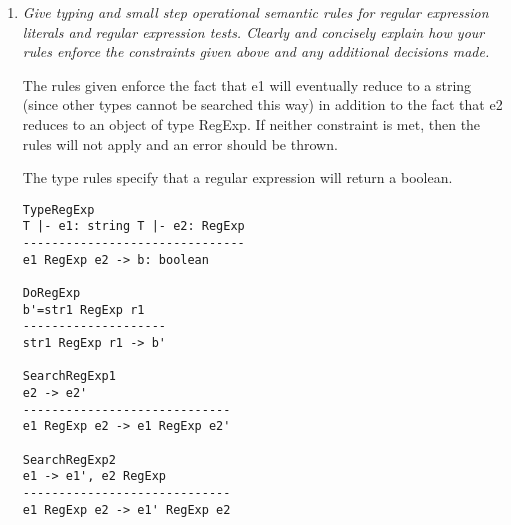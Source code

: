\documentclass[12pt,letterpaper]{article}
\begin{document}
\begin{enumerate}
\begin{enumerate}
\item \textit{Give typing and small step operational semantic rules for regular expression literals and regular expression tests. Clearly and concisely explain how your rules enforce the constraints given above and any additional
decisions made.}

The rules given enforce the fact that e1 will eventually reduce to a string (since other types cannot be searched this way) in addition to the fact that e2 reduces to an object of type RegExp. If neither constraint is met, then the rules will not apply and an error should be thrown.

The type rules specify that a regular expression will return a boolean.

\begin{verbatim}
TypeRegExp
T |- e1: string T |- e2: RegExp
-------------------------------
e1 RegExp e2 -> b: boolean

DoRegExp
b'=str1 RegExp r1
--------------------
str1 RegExp r1 -> b'

SearchRegExp1
e2 -> e2'
-----------------------------
e1 RegExp e2 -> e1 RegExp e2'

SearchRegExp2
e1 -> e1', e2 RegExp
-----------------------------
e1 RegExp e2 -> e1' RegExp e2



\end{verbatim}
\end{enumerate}

\end{enumerate}
\end{document}
